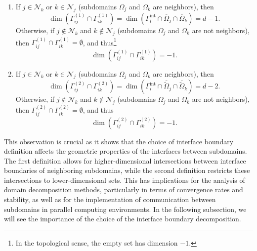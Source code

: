 \begin{enumerate}[label = (\arabic*)]
    \item If $j\in \mathcal{N}_{k}$ or $k \in \mathcal{N}_{j}$ (subdomains $\Omega_j$ and $\Omega_k$ are neighbors), then
    \begin{equation*}
        \dim\left(\Gamma_{ij}^{(1)} \cap \Gamma_{ik}^{(1)}\right) = \dim\left(\Gamma_{i}^{\text{int}} \cap \overline{\Omega}_j \cap \overline{\Omega}_k\right) = d-1.
    \end{equation*}
    Otherwise, if $j \notin \mathcal{N}_{k}$ and $k \notin \mathcal{N}_{j}$ (subdomains $\Omega_j$ and $\Omega_k$ are not neighbors), then $\Gamma_{ij}^{(1)} \cap \Gamma_{ik}^{(1)} = \emptyset$, and thus\footnote{In the topological sense, the empty set has dimension $-1$.}
    \begin{equation*}
        \dim\left(\Gamma_{ij}^{(1)} \cap \Gamma_{ik}^{(1)}\right) = -1.
    \end{equation*}
    \item If $j\in \mathcal{N}_{k}$ or $k \in \mathcal{N}_{j}$ (subdomains $\Omega_j$ and $\Omega_k$ are neighbors), then
    \begin{equation*}
        \dim\left(\Gamma_{ij}^{(2)} \cap \Gamma_{ik}^{(2)}\right) = \dim\left(\Gamma_{i}^{\text{int}} \cap \overline{\widetilde{\Omega}}_j \cap \overline{\widetilde{\Omega}}_k\right) = d-2.
    \end{equation*}
    Otherwise, if $j \notin \mathcal{N}_{k}$ and $k \notin \mathcal{N}_{j}$ (subdomains $\Omega_j$ and $\Omega_k$ are not neighbors), then $\Gamma_{ij}^{(2)} \cap \Gamma_{ik}^{(2)} = \emptyset$, and thus
    \begin{equation*}
        \dim\left(\Gamma_{ij}^{(2)} \cap \Gamma_{ik}^{(2)}\right) = -1.
    \end{equation*}
\end{enumerate}
This observation is crucial as it shows that the choice of interface boundary definition affects the geometric properties of the interfaces between subdomains. 
The first definition allows for higher-dimensional intersections between interface boundaries of neighboring subdomains, while the second definition restricts 
these intersections to lower-dimensional sets. This has implications for the analysis of domain decomposition methods, particularly in terms of convergence rates 
and stability, as well as for the implementation of communication between subdomains in parallel computing environments. In the following subsection, we will see
the importance of the choice of the interface boundary decomposition.

